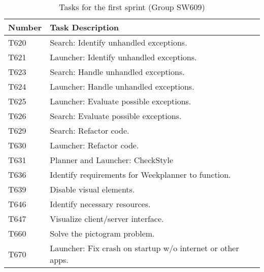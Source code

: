 \begin{table}[H]
\centering
\label{S01:Tasks}
\begin{tabular}{|l|l|}
\hline
Number 			& Task Description 											\\\hline
T620  			& Search: Identify unhandled exceptions.                 	\\\hline
T621    	   	& Launcher: Identify unhandled exceptions. 					\\\hline 
T623	       	& Search: Handle unhandled exceptions.                 		\\\hline
T624    	   	& Launcher: Handle unhandled exceptions.  					\\\hline
T625   	   		& Launcher: Evaluate possible exceptions.        			\\\hline
T626   	   		& Search: Evaluate possible exceptions.                		\\\hline
T629  	   		& Search: Refactor code.			   						\\\hline
T630       		& Launcher: Refactor code.                 					\\\hline
T631       		& Planner and Launcher: CheckStyle                 			\\\hline
T636       		& Identify requirements for Weekplanner to function.   		\\\hline 
T639       		& Disable visual elements.                 					\\\hline
T646       		& Identify necessary resources.                 			\\\hline
T647       		& Visualize client/server interface.                 		\\\hline 
T660       		& Solve the pictogram problem.                 				\\\hline
T670       		& Launcher: Fix crash on startup w/o internet or other apps.\\\hline
\end{tabular}
\caption{Tasks for the first sprint (Group SW609)}
\end{table}







